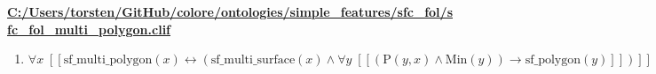 \documentclass{article}
\begin{document}
\textbf{\url{C:/Users/torsten/GitHub/colore/ontologies/simple\_features/sfc\_fol/sfc\_fol\_multi\_polygon.clif}}

\begin{enumerate}
\item $\forall x\;  \left[ \left[ \textrm{sf\_multi\_polygon}(x) \leftrightarrow \left(\textrm{sf\_multi\_surface}(x) \land \forall y\;  \left[ \left[ \left(\textrm{P}(y,x) \land \textrm{Min}(y)\right) \rightarrow \textrm{sf\_polygon}(y) \right] \right]\right) \right] \right]$
\end{enumerate}
\end{document}
